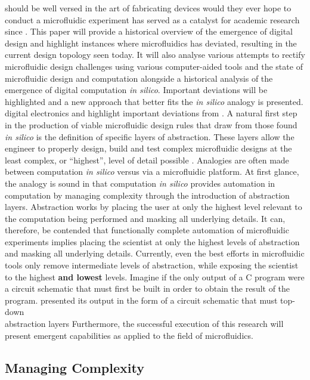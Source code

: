 \documentclass[11pt,journal,compsoc, onecolumn]{IEEEtran}
\begin{document}
should be well
versed in the art of fabricating devices would they
ever hope to conduct a microfluidic experiment has served as a catalyst for
academic research since . This paper will provide a
historical overview of the emergence of digital design and highlight instances
where microfluidics has deviated, resulting in the current design topology seen
today. It will also analyse various attempts to rectify microfluidic design
challenges using various computer-aided tools and
the state of microfluidic design and computation alongside a historical
analysis of the emergence of digital computation \emph{in silico}. Important
deviations will be highlighted and a new approach that better fits the \emph{in
silico} analogy is presented. 
digital electronics and highlight important deviations from . A natural
first step in the production of viable microfluidic design rules that draw from
those found \emph{in silico} is the
definition of specific layers of abstraction. These layers allow the engineer to
properly design, build and test complex microfluidic designs at the least
complex, or ``highest'', level of detail possible \cite{thies2008}.
Analogies are often made between computation \emph{in silico} versus via a
microfluidic platform. At first glance, the analogy is sound in that
computation \emph{in silico} provides automation in computation
by managing complexity through the introduction of abstraction layers.
Abstraction works by placing the user at only the highest level relevant to the
computation being performed and masking all underlying details. It can,
therefore, be contended that functionally complete automation of microfluidic
experiments implies placing the scientist at only the highest levels of
abstraction and masking all underlying details. Currently, even the best
efforts in microfluidic tools only remove intermediate levels of
abstraction, while exposing the scientist to the highest \textbf{and lowest}
levels. Imagine if the only output of a C program were a circuit schematic that
must first be built in order to obtain the result of the program. 
presented its output in the form of a circuit
schematic that must 
top-down\cite{minhass2013}\cite{melin2007} \\
abstraction layers\cite{thies2008}
Furthermore, the successful execution of
this research will present emergent capabilities as applied to the field of
microfluidics.

\subsection{Managing Complexity}
\end{document}
